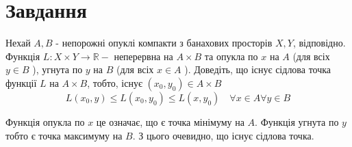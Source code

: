 
\chapter{Завдання \theHchapter}

\begin{tcolorbox}[title=Завдання]
    Нехай $A, B$ - непорожні опуклі компакти з банахових просторів $X, Y$, 
    відповідно. 
    Функція $L: X \times Y \rightarrow \mathbb{R}-$ 
    неперервна на $A \times B$ та 
    опукла по $x$ на $A$ (для всіх $y \in B$ ), 
    угнута по $y$ на $B$ (для всіх $x \in A$ ). 
    Доведіть, що існує сідлова точка функції $L$ на $A \times B$, 
    тобто, існує $\left(x_{0}, y_{0}\right) \in A \times B$
    $$L\left(x_{0}, y\right) \leq L\left(x_{0}, y_{0}\right) 
    \leq L\left(x, y_{0}\right) \quad \forall x \in A \forall y \in B$$
\end{tcolorbox}



Функція опукла по $x$ це означає, що є точка мінімуму на $A$. 
Функція угнута по $y$ тобто є точка максимуму на $B$. 
З цього очевидно, що існує сідлова точка.